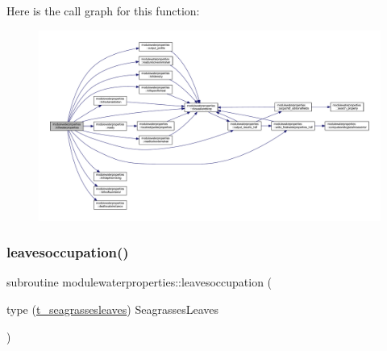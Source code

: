 Here is the call graph for this function\+:\nopagebreak
\begin{figure}[H]
\begin{center}
\leavevmode
\includegraphics[width=350pt]{namespacemodulewaterproperties_a1b9de12d1335129516b68f6f80f85e49_cgraph}
\end{center}
\end{figure}
\mbox{\label{namespacemodulewaterproperties_ac74bdef93cc8e54e691452462dce15da}} 
\subsubsection{\texorpdfstring{leavesoccupation()}{leavesoccupation()}}
{\footnotesize\ttfamily subroutine modulewaterproperties\+::leavesoccupation (\begin{DoxyParamCaption}\item[{type (\mbox{\hyperlink{structmodulewaterproperties_1_1t__seagrassesleaves}{t\+\_\+seagrassesleaves}})}]{Seagrasses\+Leaves }\end{DoxyParamCaption})\hspace{0.3cm}{\ttfamily [private]}}

